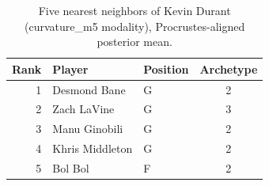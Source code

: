 \begin{table}[htbp]
  \centering\small
  \begin{tabular}{rllc}
    \toprule
    Rank & Player & Position & Archetype \\
    \midrule
    1 & Desmond Bane & G & 2 \\
    2 & Zach LaVine & G & 3 \\
    3 & Manu Ginobili & G & 2 \\
    4 & Khris Middleton & G & 2 \\
    5 & Bol Bol & F & 2 \\
    \bottomrule
  \end{tabular}
  \caption{Five nearest neighbors of Kevin Durant (curvature_m5 modality), Procrustes-aligned posterior mean.}
  \label{tab:Kevin_Durant_neighbors_curvature_m5}
\end{table}

